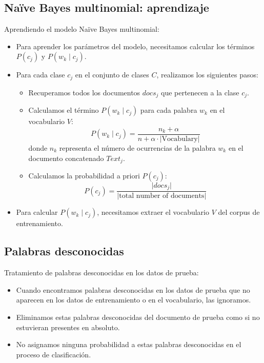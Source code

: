 \subsection{Naïve Bayes multinomial: aprendizaje}

Aprendiendo el modelo Naïve Bayes multinomial:
\begin{itemize}
    \item Para aprender los parámetros del modelo, necesitamos calcular los términos $P(c_j)$ y $P(w_k \mid c_j)$.
    \item Para cada clase $c_j$ en el conjunto de clases $C$, realizamos los siguientes pasos:
    \begin{itemize}
        \item Recuperamos todos los documentos $docs_j$ que pertenecen a la clase $c_j$.
        \item Calculamos el término $P(w_k \mid c_j)$ para cada palabra $w_k$ en el vocabulario $V$:
        \[
        P(w_k \mid c_j) = \frac{{n_k + \alpha}}{{n + \alpha \cdot \lvert \text{Vocabulary} \rvert}}
        \]
        donde $n_k$ representa el número de ocurrencias de la palabra $w_k$ en el documento concatenado $Text_j$.
        \item Calculamos la probabilidad a priori $P(c_j)$:
        \[
        P(c_j) = \frac{{\lvert docs_j \rvert}}{{\lvert \text{total number of documents} \rvert}}
        \]
    \end{itemize}
    \item Para calcular $P(w_k \mid c_j)$, necesitamos extraer el vocabulario $V$ del corpus de entrenamiento.
\end{itemize}

\subsection{Palabras desconocidas}

Tratamiento de palabras desconocidas en los datos de prueba:
\begin{itemize}
    \item Cuando encontramos palabras desconocidas en los datos de prueba que no aparecen en los datos de entrenamiento o en el vocabulario, las ignoramos.
    \item Eliminamos estas palabras desconocidas del documento de prueba como si no estuvieran presentes en absoluto.
    \item No asignamos ninguna probabilidad a estas palabras desconocidas en el proceso de clasificación.
\end{itemize}


